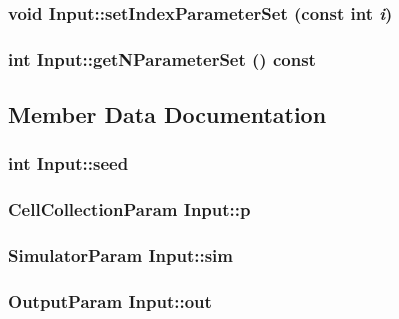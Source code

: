 \subsubsection{\setlength{\rightskip}{0pt plus 5cm}void Input::setIndexParameterSet (const int {\em i})}\label{classInput_8f085cfd1e929ffeb6493d52265f69d9}


\subsubsection{\setlength{\rightskip}{0pt plus 5cm}int Input::getNParameterSet () const}\label{classInput_abbb875892aef9fb2e3855f85f742c85}




\subsection{Member Data Documentation}
\subsubsection{\setlength{\rightskip}{0pt plus 5cm}int {\bf Input::seed}}\label{classInput_9ba0dddeba07d5be04e894c6ceecd6d9}


\subsubsection{\setlength{\rightskip}{0pt plus 5cm}CellCollectionParam {\bf Input::p}}\label{classInput_2d15599a9c23b27330ae868928d2997d}


\subsubsection{\setlength{\rightskip}{0pt plus 5cm}SimulatorParam {\bf Input::sim}}\label{classInput_cc3f4f428e3a7e40eec817496ad85deb}


\subsubsection{\setlength{\rightskip}{0pt plus 5cm}OutputParam {\bf Input::out}}\label{classInput_4efa8e11da83057d1a7a7b828033438d}


